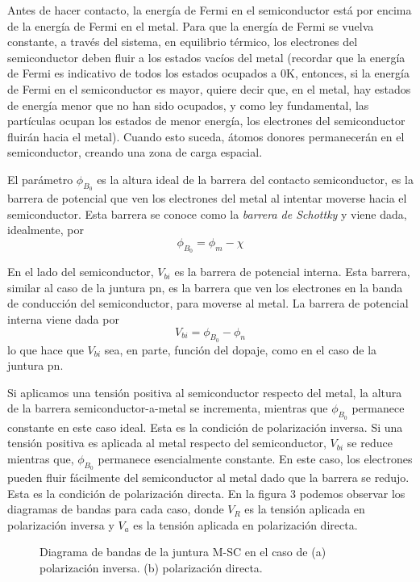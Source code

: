 \documentclass[12pt,a4paper]{article}
\begin{document}
Antes de hacer contacto, la energía de Fermi en el semiconductor está por encima de la energía de Fermi en el metal. Para que la energía de Fermi se vuelva constante, a través del sistema, en equilibrio térmico, los electrones del semiconductor deben fluir a los estados vacíos del metal (recordar que la energía de Fermi es indicativo de todos los estados ocupados a 0K, entonces, si la energía de Fermi en el semiconductor es mayor, quiere decir que, en el metal, hay estados de energía menor que no han sido ocupados, y como ley fundamental, las partículas ocupan los estados de menor energía, los electrones del semiconductor fluirán hacia el metal). Cuando esto suceda, átomos donores permanecerán en el semiconductor, creando una zona de carga espacial.

El parámetro $\phi _{B_{0}}$ es la altura ideal de la barrera del contacto semiconductor, es la barrera de potencial que ven los electrones del metal al intentar moverse hacia el semiconductor. Esta barrera se conoce como la \emph{barrera de Schottky} y viene dada, idealmente, por
\[ \phi _{B_{0}}=\phi _{m} - \chi \]

En el lado del semiconductor, $V_{bi}$ es la barrera de potencial interna. Esta barrera, similar al caso de la juntura pn, es la barrera que ven los electrones en la banda de conducción del semiconductor, para moverse al metal. La barrera de potencial interna viene dada por
\[ V_{bi}=\phi _{B_{0}} - \phi _{n} \]
lo que hace que $V_{bi}$ sea, en parte, función del dopaje, como en el caso de la juntura pn.

Si aplicamos una tensión positiva al semiconductor respecto del metal, la altura de la barrera semiconductor-a-metal se incrementa, mientras que $\phi _{B_{0}}$ permanece constante en este caso ideal. Esta es la condición de polarización inversa. Si una tensión positiva es aplicada al metal respecto del semiconductor, $V_{bi}$ se reduce mientras que, $\phi _{B_{0}}$ permanece esencialmente constante. En este caso, los electrones pueden fluir fácilmente del semiconductor al metal dado que la barrera se redujo. Esta es la condición de polarización directa. En la figura 3 podemos observar los diagramas de bandas para cada caso, donde $V_{R}$ es la tensión aplicada en polarización inversa y $V_{a}$ es la tensión aplicada en polarización directa.

\begin{figure}[ht!]
\begin{center}
\caption{Diagrama de bandas de la juntura M-SC en el caso de (a) polarización inversa. (b) polarización directa.}
\end{center}
\end{figure}
\end{document}
